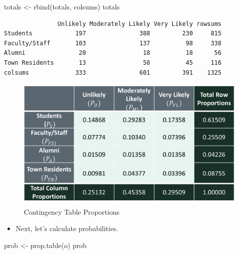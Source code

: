 \documentclass[
  letterpaper,
  DIV=11,
  numbers=noendperiod]{scrreprt}
\newenvironment{Shaded}{\begin{snugshade}}{\end{snugshade}}
\newcommand{\FunctionTok}[1]{\textcolor[rgb]{0.28,0.35,0.67}{#1}}
\newcommand{\NormalTok}[1]{\textcolor[rgb]{0.00,0.23,0.31}{#1}}
\newcommand{\OtherTok}[1]{\textcolor[rgb]{0.00,0.23,0.31}{#1}}
\providecommand{\tightlist}{%
  \setlength{\itemsep}{0pt}\setlength{\parskip}{0pt}}\usepackage{longtable,booktabs,array}
\begin{document}
\begin{Shaded}
\begin{Highlighting}[]
\NormalTok{totals }\OtherTok{\textless{}{-}} \FunctionTok{rbind}\NormalTok{(totals, colsums)}
\NormalTok{totals}
\end{Highlighting}
\end{Shaded}

\begin{verbatim}
               Unlikely Moderately Likely Very Likely rowsums
Students            197               388         230     815
Faculty/Staff       103               137          98     338
Alumni               20                18          18      56
Town Residents       13                58          45     116
colsums             333               601         391    1325
\end{verbatim}

\begin{figure}[H]

{\centering \includegraphics{Pictures/Ch5/ConTblProp.png}

}

\caption{Contingency Table Proportions}

\end{figure}%

\begin{itemize}
\tightlist
\item
  Next, let's calculate probabilities.
\end{itemize}

\begin{Shaded}
\begin{Highlighting}[]
\NormalTok{prob }\OtherTok{\textless{}{-}} \FunctionTok{prop.table}\NormalTok{(o)}
\NormalTok{prob}
\end{Highlighting}
\end{Shaded}
\end{document}
